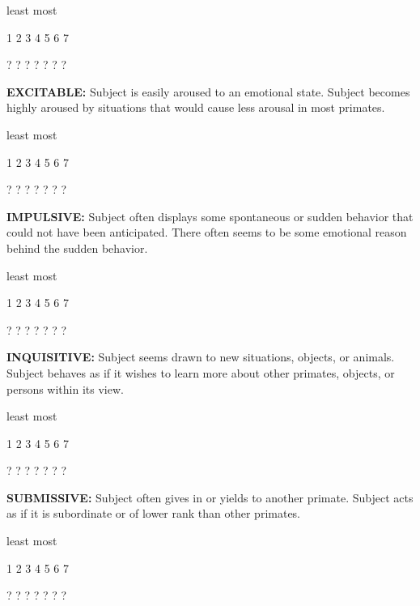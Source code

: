 \documentclass{article} %
\begin{document}
\noindent  

\noindent least                            most

  1    2    3    4    5    6    7   

  ?    ?    ?    ?    ?    ?    ?   

\noindent  

\noindent \textbf{EXCITABLE:} Subject is easily aroused to an emotional state. Subject becomes highly aroused by situations that would cause less arousal in most primates. 

\noindent  

\noindent least                            most

  1    2    3    4    5    6    7   

  ?    ?    ?    ?    ?    ?    ?   

\noindent \textbf{ }

\noindent \textbf{IMPULSIVE:} Subject often displays some spontaneous or sudden behavior that could not have been anticipated. There often seems to be some emotional reason behind the sudden behavior. 

\noindent  

\noindent least                            most

  1    2    3    4    5    6    7   

  ?    ?    ?    ?    ?    ?    ?   

\noindent  

\noindent \textbf{INQUISITIVE:} Subject seems drawn to new situations, objects, or animals. Subject behaves as if it wishes to learn more about other primates, objects, or persons within its view. 

\noindent  

\noindent least                            most

  1    2    3    4    5    6    7   

  ?    ?    ?    ?    ?    ?    ?   

\noindent  

\noindent \textbf{SUBMISSIVE:} Subject often gives in or yields to another primate. Subject acts as if it is subordinate or of lower rank than other primates. 

\noindent  

\noindent least                            most

  1    2    3    4    5    6    7   

  ?    ?    ?    ?    ?    ?    ?   
\end{document}
